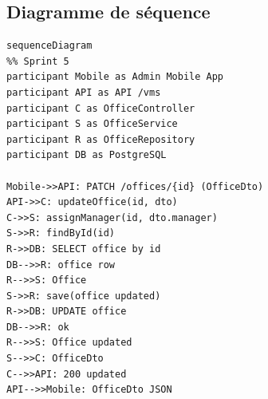 \documentclass[12pt,a4paper]{article}
\begin{document}
\subsection*{Diagramme de séquence}
\begin{verbatim}
sequenceDiagram
%% Sprint 5
participant Mobile as Admin Mobile App
participant API as API /vms
participant C as OfficeController
participant S as OfficeService
participant R as OfficeRepository
participant DB as PostgreSQL

Mobile->>API: PATCH /offices/{id} (OfficeDto)
API->>C: updateOffice(id, dto)
C->>S: assignManager(id, dto.manager)
S->>R: findById(id)
R->>DB: SELECT office by id
DB-->>R: office row
R-->>S: Office
S->>R: save(office updated)
R->>DB: UPDATE office
DB-->>R: ok
R-->>S: Office updated
S-->>C: OfficeDto
C-->>API: 200 updated
API-->>Mobile: OfficeDto JSON
\end{verbatim}
\end{document}
